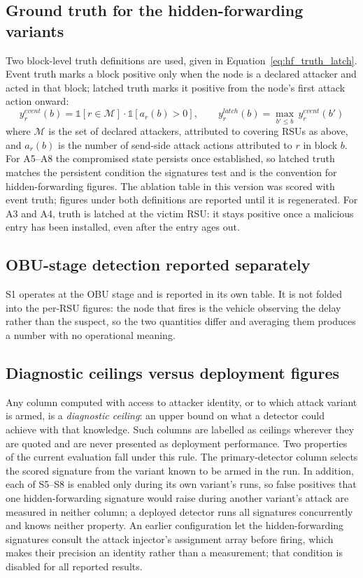 \documentclass[12pt, a4paper]{report}
\begin{document}
{{\subsection{Ground truth for the hidden-forwarding variants}
Two block-level truth definitions are used, given in
Equation~\eqref{eq:hf_truth_latch}. Event truth marks a block positive
only when the node is a declared attacker and acted in that block;
latched truth marks it positive from the node's first attack action
onward:
\begin{equation}
y^{event}_{r}(b) = \mathbb{1}[r \in \mathcal{M}] \cdot \mathbb{1}[a_r(b) > 0],
\qquad
y^{latch}_{r}(b) = \max_{b' \leq b}\, y^{event}_{r}(b')
\label{eq:hf_truth_latch}
\end{equation}
where $\mathcal{M}$ is the set of declared attackers, attributed to
covering \ac{RSU}s as above, and $a_r(b)$ is the number of send-side
attack actions attributed to $r$ in block $b$. For A5--A8 the
compromised state persists once established, so latched truth matches
the persistent condition the signatures test and is the convention for
hidden-forwarding figures. The ablation table in this version was
scored with event truth; figures under both definitions are reported
until it is regenerated. For A3 and A4, truth is latched at the victim
\ac{RSU}: it stays positive once a malicious entry has been installed,
even after the entry ages out.

\subsection{\ac{OBU}-stage detection reported separately}
S1 operates at the \ac{OBU} stage and is reported in its own table. It
is not folded into the per-\ac{RSU} figures: the node that fires is
the vehicle observing the delay rather than the suspect, so the two
quantities differ and averaging them produces a number with no
operational meaning.

\subsection{Diagnostic ceilings versus deployment figures}
Any column computed with access to attacker identity, or to which
attack variant is armed, is a \emph{diagnostic ceiling}: an upper
bound on what a detector could achieve with that knowledge. Such
columns are labelled as ceilings wherever they are quoted and are
never presented as deployment performance. Two properties of the
current evaluation fall under this rule. The primary-detector column
selects the scored signature from the variant known to be armed in the
run. In addition, each of S5--S8 is enabled only during its own
variant's runs, so false positives that one hidden-forwarding
signature would raise during another variant's attack are measured in
neither column; a deployed detector runs all signatures concurrently
and knows neither property. An earlier configuration let the hidden-forwarding
signatures consult the attack injector's assignment array before
firing, which makes their precision an identity rather than a
measurement; that condition is disabled for all reported results.

}}
\end{document}
